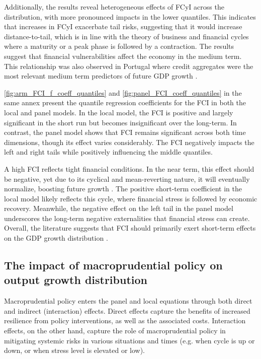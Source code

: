 \documentclass[12pt,a4paper]{article}
\begin{document}
Additionally, the results reveal heterogeneous effects of FCyI across the distribution, with more pronounced impacts in the lower quantiles. This indicates that increases in FCyI exacerbate tail risks, suggesting that it would increase distance-to-tail, which is in line with the theory of business and financial cycles where a maturity or a peak phase is followed by a contraction. The results suggest that financial vulnerabilities affect the economy in the medium term. This relationship was also observed in Portugal where credit aggregates were the most relevant medium term predictors of future GDP growth \citep{imf_gar_2019}.

\autoref{fig:arm_FCI_f_coeff_quantiles} and \autoref{fig:panel_FCI_coeff_quantiles} in the same annex present the quantile regression coefficients for the FCI in both the local and panel models. In the local model, the FCI is positive and largely significant in the short run but becomes insignificant over the long-term. In contrast, the panel model shows that FCI remains significant across both time dimensions, though its effect varies considerably. The FCI negatively impacts the left and right tails while positively influencing the middle quantiles.



A high FCI reflects tight financial conditions. In the near term, this effect should be negative, yet due to its cyclical and mean-reverting nature, it will eventually normalize, boosting future growth \citep{imf_gar_2019}. The positive short-term coefficient in the local model likely reflects this cycle, where financial stress is followed by economic recovery. Meanwhile, the negative effect on the left tail in the panel model underscores the long-term negative externalities that financial stress can create. Overall, the literature suggests that FCI should primarily exert short-term effects on the GDP growth distribution \citep{esrb2021}.

\subsection{The impact of macroprudential policy on output growth distribution}
Macroprudential policy enters the panel and local equations through both direct and indirect (interaction) effects. Direct effects capture the benefits of increased resilience from policy interventions, as well as the associated costs. Interaction effects, on the other hand, capture the role of macroprudential policy in mitigating systemic risks in various situations and times (e.g. when cycle is up or down, or when stress level is elevated or low).
\end{document}
